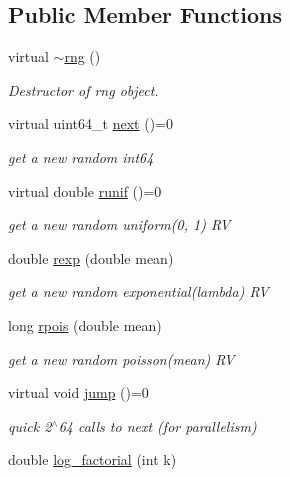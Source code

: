\subsection*{Public Member Functions}
\begin{DoxyCompactItemize}
\item 
\mbox{\label{classrng_acc0ef5e0bf2bee28c37070ddb4c21175}} 
virtual \hyperlink{classrng_acc0ef5e0bf2bee28c37070ddb4c21175}{$\sim$rng} ()
\begin{DoxyCompactList}\small\item\em Destructor of rng object. \end{DoxyCompactList}\item 
\mbox{\label{classrng_a0fa7d2415b07e3396b6ed3fb7c238606}} 
virtual uint64\+\_\+t \hyperlink{classrng_a0fa7d2415b07e3396b6ed3fb7c238606}{next} ()=0
\begin{DoxyCompactList}\small\item\em get a new random int64 \end{DoxyCompactList}\item 
\mbox{\label{classrng_a3f0fec3ad9a286726825fddbf78aada8}} 
virtual double \hyperlink{classrng_a3f0fec3ad9a286726825fddbf78aada8}{runif} ()=0
\begin{DoxyCompactList}\small\item\em get a new random uniform(0, 1) RV \end{DoxyCompactList}\item 
\mbox{\label{classrng_a3adfbfb3faf9b7fa948813f5920cd5dc}} 
double \hyperlink{classrng_a3adfbfb3faf9b7fa948813f5920cd5dc}{rexp} (double mean)
\begin{DoxyCompactList}\small\item\em get a new random exponential(lambda) RV \end{DoxyCompactList}\item 
\mbox{\label{classrng_a9c16bdeae3be90e8bd30eb284a4b2980}} 
long \hyperlink{classrng_a9c16bdeae3be90e8bd30eb284a4b2980}{rpois} (double mean)
\begin{DoxyCompactList}\small\item\em get a new random poisson(mean) RV \end{DoxyCompactList}\item 
\mbox{\label{classrng_a2203fb1d2504c000306be5a0035d1a6c}} 
virtual void \hyperlink{classrng_a2203fb1d2504c000306be5a0035d1a6c}{jump} ()=0
\begin{DoxyCompactList}\small\item\em quick 2$^\wedge$64 calls to next (for parallelism) \end{DoxyCompactList}\item 
double \hyperlink{classrng_ae85750e7f1befc4d1016731248dd3e80}{log\+\_\+factorial} (int k)
\end{DoxyCompactItemize}

